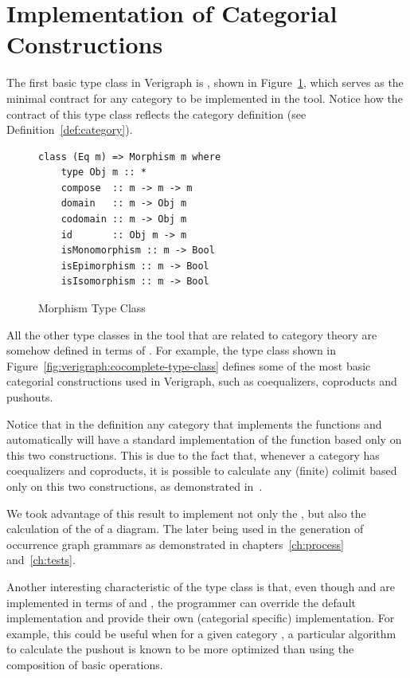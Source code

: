 \section{Implementation of Categorial Constructions}

The first basic type class in Verigraph is , shown in Figure~\ref{fig:verigraph:morphism-type-class}, which serves as the minimal contract for any category to be implemented in the tool. Notice how the contract of this type class reflects the category definition (see Definition~\ref{def:category}).

\begin{figure}[!ht]
\caption{Morphism Type Class}
\begin{verbatim}
class (Eq m) => Morphism m where
    type Obj m :: *
    compose  :: m -> m -> m
    domain   :: m -> Obj m
    codomain :: m -> Obj m
    id       :: Obj m -> m
    isMonomorphism :: m -> Bool
    isEpimorphism :: m -> Bool
    isIsomorphism :: m -> Bool
\end{verbatim}
\label{fig:verigraph:morphism-type-class}
\end{figure}

All the other type classes in the tool that are related to category theory are somehow defined in terms of . For example, the  type class shown in Figure~\ref{fig:verigraph:cocomplete-type-class} defines some of the most basic categorial constructions used in Verigraph, such as coequalizers, coproducts and pushouts.

Notice that in the  definition any category that implements the functions  and  automatically will have a standard implementation of the  function based only on this two constructions. This is due to the fact that, whenever a category has coequalizers and coproducts, it is possible to calculate any (finite) colimit based only on this two constructions, as demonstrated in~\cite{Pierce1991}.

We took advantage of this result to implement not only the , but also the calculation of the  of a diagram. The later being used in the generation of occurrence graph grammars as demonstrated in chapters~\ref{ch:process} and~\ref{ch:tests}.

Another interesting characteristic of the  type class is that, even though  and  are implemented in terms of  and , the programmer can override the default implementation and provide their own (categorial specific) implementation. For example, this could be useful when for a given category , a particular algorithm to calculate the pushout is known to be more optimized than using the composition of basic operations.

